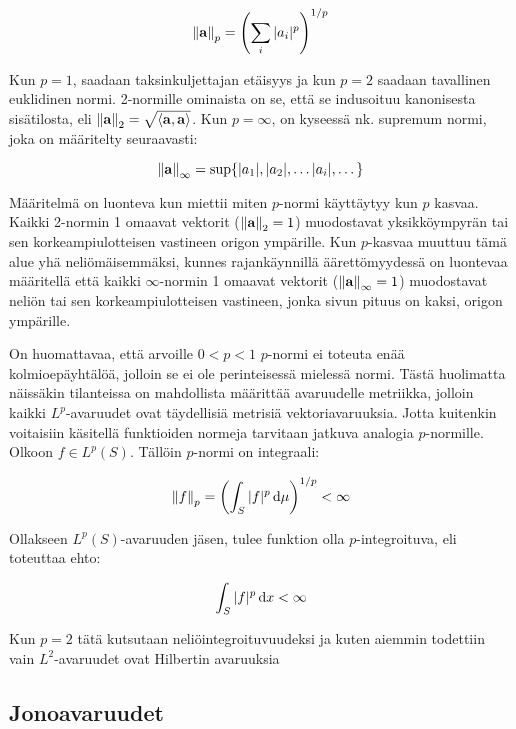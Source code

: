 \documentclass[../johdoksia.tex]{subfiles}
\begin{document}
	\begin{equation}
		\norm{\mathbf{a}}_p = \left(\sum_{i}|a_i|^p\right)^{1/p}
	\end{equation}

	Kun $p = 1$, saadaan taksinkuljettajan etäisyys ja kun $p = 2$ saadaan tavallinen euklidinen normi. 2-normille ominaista on se, että se indusoituu kanonisesta sisätilosta, eli $\norm{\mathbf{a}}_2 = \sqrt{\langle\mathbf{a},\mathbf{a}\rangle}$. Kun $p = \infty$, on kyseessä nk. supremum normi, joka on määritelty seuraavasti:
	
	\begin{equation}
		\norm{\mathbf{a}}_{\infty} = \sup\{|a_1|, |a_2|, \dots |a_i|, \dots\}
	\end{equation}

	Määritelmä on luonteva kun miettii miten $p$-normi käyttäytyy kun $p$ kasvaa. Kaikki 2-normin 1 omaavat vektorit ($\norm{\mathbf{a}}_2 = 1$) muodostavat yksikköympyrän tai sen korkeampiulotteisen vastineen origon ympärille. Kun $p$-kasvaa muuttuu tämä alue yhä neliömäisemmäksi, kunnes rajankäynnillä äärettömyydessä on luontevaa määritellä että kaikki $\infty$-normin 1 omaavat vektorit ($\norm{\mathbf{a}}_\infty = 1$) muodostavat neliön tai sen korkeampiulotteisen vastineen, jonka sivun pituus on kaksi, origon ympärille. 
	
	On huomattavaa, että arvoille $0 < p < 1$ $p$-normi ei toteuta enää kolmioepäyhtälöä, jolloin se ei ole perinteisessä mielessä normi. Tästä huolimatta näissäkin tilanteissa on mahdollista määrittää avaruudelle metriikka, jolloin kaikki $L^p$-avaruudet ovat täydellisiä metrisiä vektoriavaruuksia. Jotta kuitenkin voitaisiin käsitellä funktioiden normeja tarvitaan jatkuva analogia $p$-normille. Olkoon $f \in L^p(S)$. Tällöin $p$-normi on integraali:
	
	\begin{equation}
		\norm{f}_p = \left(\int_S|f|^p\odif{\mu}\right)^{1/p} < \infty
	\end{equation}

	Ollakseen $L^p(S)$-avaruuden jäsen, tulee funktion olla $p$-integroituva, eli toteuttaa ehto:
	
	\begin{equation}
		\int_S|f|^p\odif{x} < \infty
	\end{equation}

	Kun $p = 2$ tätä kutsutaan neliöintegroituvuudeksi ja kuten aiemmin todettiin vain $L^2$-avaruudet ovat Hilbertin avaruuksia

	\subsection{Jonoavaruudet}
	
\end{document}
